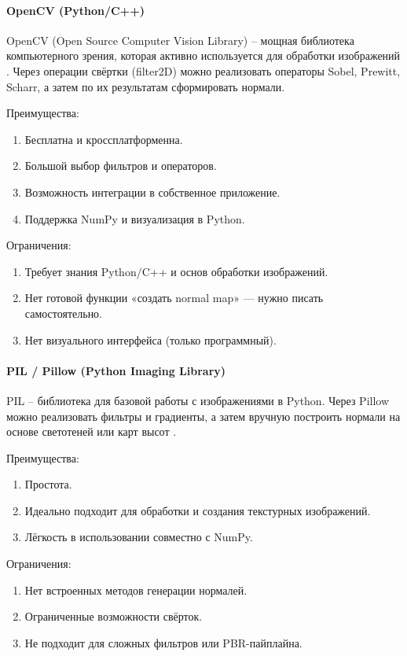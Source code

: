 \paragraph{OpenCV (Python/C++)}

OpenCV (Open Source Computer Vision Library) -- мощная библиотека компьютерного зрения, которая активно используется для обработки изображений \cite{matveev2023}. Через операции свёртки (filter2D) можно реализовать операторы Sobel, Prewitt, Scharr, а затем по их результатам сформировать нормали.

Преимущества:
\begin{enumerate}
	\item Бесплатна и кроссплатформенна.
	\item Большой выбор фильтров и операторов.
	\item Возможность интеграции в собственное приложение.
	\item Поддержка NumPy и визуализация в Python.
\end{enumerate}

Ограничения:
\begin{enumerate}
	\item Требует знания Python/C++ и основ обработки изображений.
	\item Нет готовой функции «создать normal map» — нужно писать самостоятельно.
	\item Нет визуального интерфейса (только программный).
\end{enumerate}
\paragraph{PIL / Pillow (Python Imaging Library)}

PIL -- библиотека для базовой работы с изображениями в Python. Через Pillow можно реализовать фильтры и градиенты, а затем вручную построить нормали на основе светотеней или карт высот \cite{baskar2023}.

Преимущества:
\begin{enumerate}
	\item Простота.
	\item Идеально подходит для обработки и создания текстурных изображений.
	\item Лёгкость в использовании совместно с NumPy.
\end{enumerate}

Ограничения:
\begin{enumerate}
	\item Нет встроенных методов генерации нормалей.
	\item Ограниченные возможности свёрток.
	\item Не подходит для сложных фильтров или PBR-пайплайна.
\end{enumerate}
